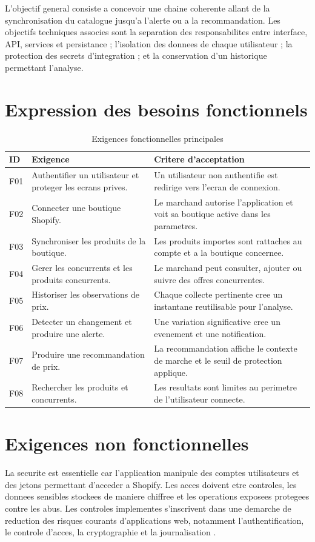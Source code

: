 \documentclass[12pt,a4paper,oneside]{report}
\begin{document}
L'objectif general consiste a concevoir une chaine coherente allant de la synchronisation du catalogue jusqu'a l'alerte ou a la recommandation. Les objectifs techniques associes sont la separation des responsabilites entre interface, API, services et persistance ; l'isolation des donnees de chaque utilisateur ; la protection des secrets d'integration ; et la conservation d'un historique permettant l'analyse.

\section{Expression des besoins fonctionnels}
\begin{table}[H]
\centering
\caption{Exigences fonctionnelles principales}
\label{tab:functional-requirements}
\begin{tabularx}{\textwidth}{p{}p{}Y}
\toprule
\textbf{ID} & \textbf{Exigence} & \textbf{Critere d'acceptation} \\
\midrule
F01 & Authentifier un utilisateur et proteger les ecrans prives. & Un utilisateur non authentifie est redirige vers l'ecran de connexion. \\
F02 & Connecter une boutique Shopify. & Le marchand autorise l'application et voit sa boutique active dans les parametres. \\
F03 & Synchroniser les produits de la boutique. & Les produits importes sont rattaches au compte et a la boutique concernee. \\
F04 & Gerer les concurrents et les produits concurrents. & Le marchand peut consulter, ajouter ou suivre des offres concurrentes. \\
F05 & Historiser les observations de prix. & Chaque collecte pertinente cree un instantane reutilisable pour l'analyse. \\
F06 & Detecter un changement et produire une alerte. & Une variation significative cree un evenement et une notification. \\
F07 & Produire une recommandation de prix. & La recommandation affiche le contexte de marche et le seuil de protection applique. \\
F08 & Rechercher les produits et concurrents. & Les resultats sont limites au perimetre de l'utilisateur connecte. \\
\bottomrule
\end{tabularx}
\end{table}

\section{Exigences non fonctionnelles}
La securite est essentielle car l'application manipule des comptes utilisateurs et des jetons permettant d'acceder a Shopify. Les acces doivent etre controles, les donnees sensibles stockees de maniere chiffree et les operations exposees protegees contre les abus. Les controles implementes s'inscrivent dans une demarche de reduction des risques courants d'applications web, notamment l'authentification, le controle d'acces, la cryptographie et la journalisation \cite{owasp2025}.
\end{document}
